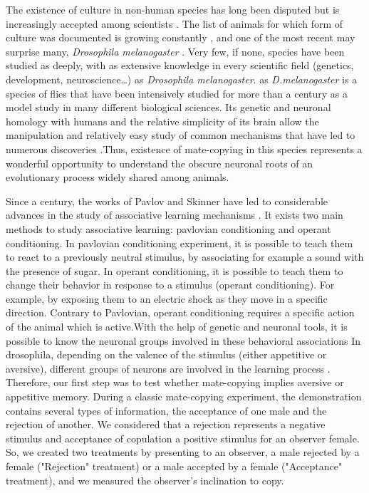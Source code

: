 \documentclass[a4paper, 12pt]{article}
\begin{document}
The existence of culture in non-human species has long been disputed \parencite{laland_animals_2003} but is increasingly accepted among scientists \parencite{aplin_experimentally_2015, whitehead_geneculture_2017}. The list of animals for which form of culture was documented is growing constantly \parencite{van_schaik_orangutan_2003, thornton_alex_multi-generational_2010, whiten_culture_2017} , and one of the most recent may surprise many, \textit{Drosophila melanogaster} \parencite{danchin_cultural_2018}.  Very few, if none, species have been studied as deeply, with as extensive knowledge in every scientific field (genetics, development, neuroscience…) as \textit{Drosophila melanogaster}. as \textit{D.melanogaster} is a species of flies that have been intensively studied for more than a century as a model study in many different biological sciences. Its genetic and neuronal homology with humans and the relative simplicity of its brain allow the manipulation and relatively easy study of common mechanisms that have led to numerous discoveries \parencite{bellen_100_2010, ugur_drosophila_2016, hewitt_mechanisms_2017}.Thus, existence of mate-copying in this species represents a wonderful opportunity to understand the obscure neuronal roots of an evolutionary process widely shared among animals.  

Since a century, the works of Pavlov and Skinner have led to considerable advances in the study of associative learning mechanisms \parencite{pavlov_conditioned_1927, iversen_skinners_1992}. It exists two main methods to study associative learning: pavlovian conditioning and operant conditioning. In pavlovian conditioning experiment, it is possible to teach them to react to a previously neutral stimulus, by associating for example a sound with the presence of sugar. In operant conditioning, it is possible to teach them to change their behavior in response to a stimulus (operant conditioning). For example, by exposing them to an electric shock as they move in a specific direction. Contrary to Pavlovian, operant conditioning requires a specific action of the animal which is active.With the help of genetic and neuronal tools, it is possible to know the neuronal groups involved  in these behavioral associations In drosophila, depending on the valence of the stimulus (either appetitive or aversive), different groups of neurons are involved in the learning process \parencite{vogt_shared_2014, busto_olfactory_2010}. Therefore, our first step was to test whether mate-copying implies aversive or appetitive memory. During a classic mate-copying experiment, the demonstration contains several types of information, the acceptance of one male and the rejection of another. We considered that a rejection represents a negative stimulus and acceptance of copulation a positive stimulus for an observer female. So, we created two treatments by presenting to an observer, a male rejected by a female ("Rejection" treatment) or a male accepted by a female ("Acceptance" treatment), and we measured the observer’s inclination to copy. 
	
\end{document}
